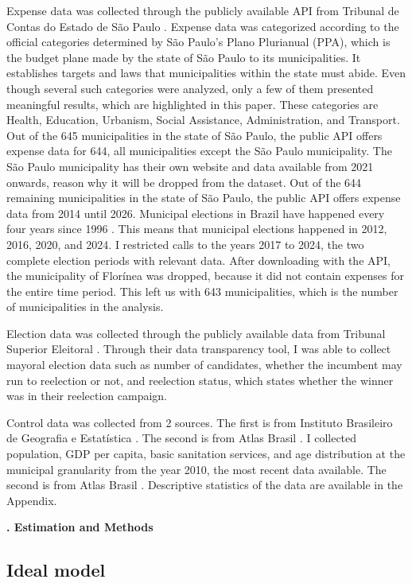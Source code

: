 \documentclass[12pt, a4paper]{article}
\newcounter{headercounter}
\newcommand{\header}[1]{\begin{center}{\large \textbf{\Roman{headercounter}. #1}} \end{center} \stepcounter{headercounter}}
\begin{document}
Expense data was collected through the publicly available API from Tribunal de Contas do Estado de São Paulo \cite{TCESP:expenses}. Expense data was categorized according to the official categories determined by São Paulo's Plano Plurianual (PPA), which is the budget plane made by the state of São Paulo to its municipalities. It establishes targets and laws that municipalities within the state must abide. Even though several such categories were analyzed, only a few of them presented meaningful results, which are highlighted in this paper. These categories are Health, Education, Urbanism, Social Assistance, Administration, and Transport. Out of the 645 municipalities in the state of São Paulo, the public API offers expense data for 644, all municipalities except the São Paulo municipality. The São Paulo municipality has their own website and data available from 2021 onwards, reason why it will be dropped from the dataset. Out of the 644 remaining municipalities in the state of São Paulo, the public API offers expense data from 2014 until 2026. Municipal elections in Brazil have happened every four years since 1996 \cite{TSE:eleicao}. This means that municipal elections happened in 2012, 2016, 2020, and 2024. I restricted calls to the years 2017 to 2024, the two complete election periods with relevant data. After downloading with the API, the municipality of Florínea was dropped, because it did not contain expenses for the entire time period. This left us with 643 municipalities, which is the number of municipalities in the analysis.

Election data was collected through the publicly available data from Tribunal Superior Eleitoral \cite{TSE:data}. Through their data transparency tool, I was able to collect mayoral election data such as number of candidates, whether the incumbent may run to reelection or not, and reelection status, which states whether the winner was in their reelection campaign.

Control data was collected from 2 sources. The first is from Instituto Brasileiro de Geografia e Estatística \cite{IBGE:sidra}. The second is from Atlas Brasil \cite{atlas:idh}. I collected population, GDP per capita, basic sanitation services, and age distribution at the municipal granularity from the year 2010, the most recent data available. The second is from Atlas Brasil \cite{atlas:idh}. Descriptive statistics of the data are available in the Appendix.

\header{Estimation and Methods}

\subsection*{Ideal model}
\end{document}
